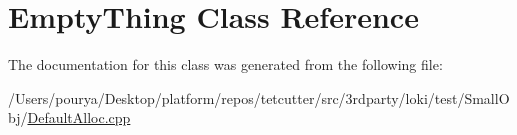 \hypertarget{classEmptyThing}{}\section{Empty\+Thing Class Reference}
\label{classEmptyThing}


The documentation for this class was generated from the following file\+:\begin{DoxyCompactItemize}
\item 
/\+Users/pourya/\+Desktop/platform/repos/tetcutter/src/3rdparty/loki/test/\+Small\+Obj/\hyperlink{DefaultAlloc_8cpp}{Default\+Alloc.\+cpp}\end{DoxyCompactItemize}
